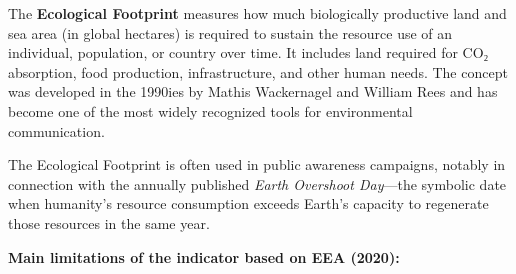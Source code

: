 \documentclass[
  a4paper,
  openany]{book}
\begin{document}
\begin{tcolorbox}[enhanced jigsaw, coltitle=black, bottomtitle=1mm, opacitybacktitle=0.6, titlerule=0mm, opacityback=0, leftrule=.75mm, colbacktitle=quarto-callout-tip-color!10!white, bottomrule=.15mm, toptitle=1mm, breakable, title={The Ecological Footprint -- Explanation and Critique}, arc=.35mm, rightrule=.15mm, toprule=.15mm, left=2mm, colback=white, colframe=quarto-callout-tip-color-frame]

The \textbf{Ecological Footprint} measures how much biologically
productive land and sea area (in global hectares) is required to sustain
the resource use of an individual, population, or country over time. It
includes land required for CO₂ absorption, food production,
infrastructure, and other human needs. The concept was developed in the
1990ies by Mathis Wackernagel and William Rees and has become one of the
most widely recognized tools for environmental communication.

The Ecological Footprint is often used in public awareness campaigns,
notably in connection with the annually published \emph{Earth Overshoot
Day}---the symbolic date when humanity's resource consumption exceeds
Earth's capacity to regenerate those resources in the same year.

\end{tcolorbox}

\textbf{Main limitations of the indicator based on EEA (2020):}
\end{document}
